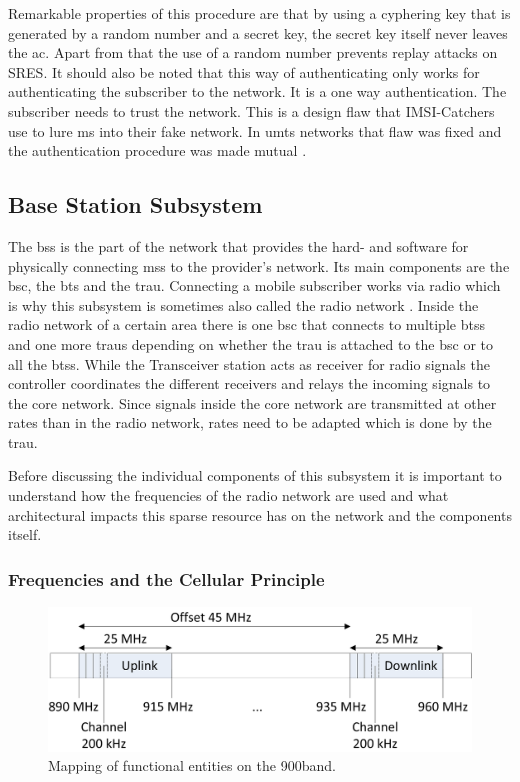 Remarkable properties of this procedure are that by using a cyphering key that is generated by a random number and a secret key, the secret key itself never leaves the \gls{ac}.
Apart from that the use of a random number prevents replay attacks on SRES.
It should also be noted that this way of authenticating only works for authenticating the subscriber to the network.
It is a one way authentication.
The subscriber needs to trust the network.
This is a design flaw that IMSI-Catchers use to lure \gls{ms} into their fake network.
In \gls{umts} networks that flaw was fixed and the authentication procedure was made mutual \cite{kommsys2006}.

\subsection{Base Station Subsystem}
\label{sec:bss}
The \gls{bss} is the part of the network that provides the hard- and software for physically connecting \glspl{ms} to the provider's network.
Its main components are the \gls{bsc}, the \gls{bts} and the \gls{trau}.
Connecting a mobile subscriber works via radio which is why this subsystem is sometimes also called the radio network \cite{kommsys2006}.
Inside the radio network of a certain area there is one \gls{bsc} that connects to multiple \glspl{bts} and one more \glspl{trau} depending on whether the \gls{trau} is attached to the \gls{bsc} or to all the \glspl{bts}.
While the Transceiver station acts as receiver for radio signals the controller coordinates the different receivers and relays the incoming signals  to the core network.
Since signals inside the core network are transmitted at other rates than in the radio network, rates need to be adapted which is done by the \gls{trau}.

Before discussing the individual components of this subsystem it is important to understand how the frequencies of the radio network are used and what architectural impacts this sparse resource has on the network and the components itself.

\subsubsection{Frequencies and the Cellular Principle}
\begin{figure}
\centering
\includegraphics{../Images/Mapping}
\caption{Mapping of functional entities on the 900\MHz band.}
\label{fig:frequency}
\end{figure}

